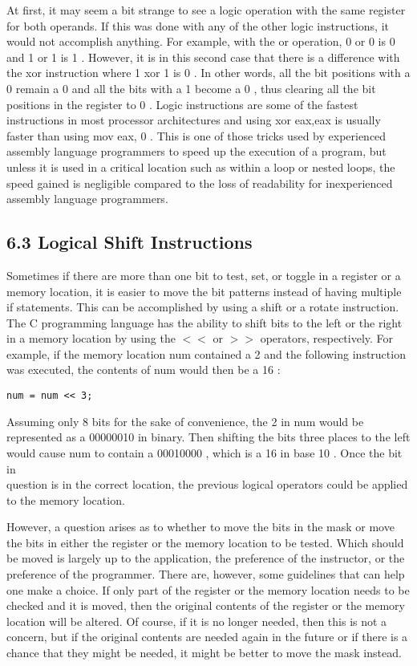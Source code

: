 \documentclass[10pt]{article}
\begin{document}
At first, it may seem a bit strange to see a logic operation with the same register for both operands. If this was done with any of the other logic instructions, it would not accomplish anything. For example, with the or operation, 0 or 0 is 0 and 1 or 1 is 1 . However, it is in this second case that there is a difference with the xor instruction where 1 xor 1 is 0 . In other words, all the bit positions with a 0 remain a 0 and all the bits with a 1 become a 0 , thus clearing all the bit positions in the register to 0 . Logic instructions are some of the fastest instructions in most processor architectures and using xor eax,eax is usually faster than using mov eax, 0 . This is one of those tricks used by experienced assembly language programmers to speed up the execution of a program, but unless it is used in a critical location such as within a loop or nested loops, the speed gained is negligible compared to the loss of readability for inexperienced assembly language programmers.

\subsection*{6.3 Logical Shift Instructions}
Sometimes if there are more than one bit to test, set, or toggle in a register or a memory location, it is easier to move the bit patterns instead of having multiple if statements. This can be accomplished by using a shift or a rotate instruction. The C programming language has the ability to shift bits to the left or the right in a memory location by using the $<<$ or $>>$ operators, respectively. For example, if the memory location num contained a 2 and the following instruction was executed, the contents of num would then be a 16 :

\begin{verbatim}
num = num << 3;
\end{verbatim}

Assuming only 8 bits for the sake of convenience, the 2 in num would be represented as a 00000010 in binary. Then shifting the bits three places to the left would cause num to contain a 00010000 , which is a 16 in base 10 . Once the bit in\\
question is in the correct location, the previous logical operators could be applied to the memory location.

However, a question arises as to whether to move the bits in the mask or move the bits in either the register or the memory location to be tested. Which should be moved is largely up to the application, the preference of the instructor, or the preference of the programmer. There are, however, some guidelines that can help one make a choice. If only part of the register or the memory location needs to be checked and it is moved, then the original contents of the register or the memory location will be altered. Of course, if it is no longer needed, then this is not a concern, but if the original contents are needed again in the future or if there is a chance that they might be needed, it might be better to move the mask instead.
\end{document}
